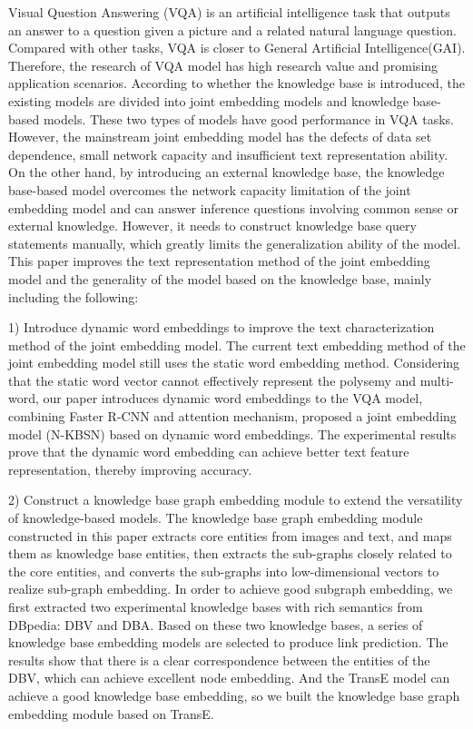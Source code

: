 
\begin{englishabstract}
Visual Question Answering (VQA) is an artificial intelligence task that outputs an answer to a question given a picture and a related natural language question. Compared with other tasks, VQA is closer to General Artificial Intelligence(GAI). Therefore, the research of VQA model has high research value and promising application scenarios. According to whether the knowledge base is introduced, the existing models are divided into joint embedding models and knowledge base-based models. These two types of models have good performance in VQA tasks. However, the mainstream joint embedding model has the defects of data set dependence, small network capacity and insufficient text representation ability. On the other hand, by introducing an external knowledge base, the knowledge base-based model overcomes the network capacity limitation of the joint embedding model and can answer inference questions involving common sense or external knowledge. However, it needs to construct knowledge base query statements manually, which greatly limits the generalization ability of the model. This paper improves the text representation method of the joint embedding model and the generality of the model based on the knowledge base, mainly including the following:

1) Introduce dynamic word embeddings to improve the text characterization method of the joint embedding model. The current text embedding method of the joint embedding model still uses the static word embedding method. Considering that the static word vector cannot effectively represent the polysemy and multi-word, our paper introduces dynamic word embeddings to the VQA model, combining Faster R-CNN and attention mechanism, proposed a joint embedding model (N-KBSN) based on dynamic word embeddings. The experimental results prove that the dynamic word embedding can achieve better text feature representation, thereby improving accuracy. 

2) Construct a knowledge base graph embedding module to extend the versatility of knowledge-based models. The knowledge base graph embedding module constructed in this paper extracts core entities from images and text, and maps them as knowledge base entities, then extracts the sub-graphs closely related to the core entities, and converts the sub-graphs into low-dimensional vectors to realize sub-graph embedding. In order to achieve good subgraph embedding, we first extracted two experimental knowledge bases with rich semantics from DBpedia: DBV and DBA. Based on these two knowledge bases, a series of knowledge base embedding models are selected to produce link prediction. The results show that there is a clear correspondence between the entities of the DBV, which can achieve excellent node embedding. And the TransE model can achieve a good knowledge base embedding, so we built the knowledge base graph embedding module based on TransE.


\end{englishabstract}

